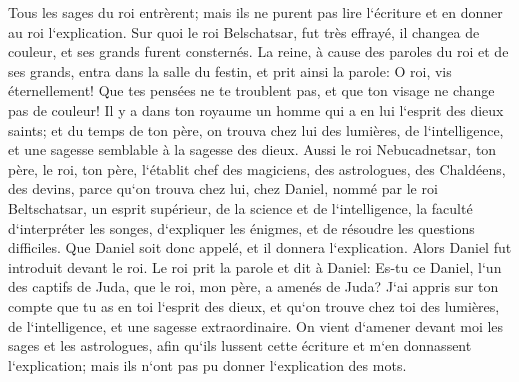 \verse Tous les sages du roi entrèrent; mais ils ne purent pas lire l`écriture et en donner au roi l`explication. 
\verse Sur quoi le roi Belschatsar, fut très effrayé, il changea de couleur, et ses grands furent consternés. 
\verse La reine, à cause des paroles du roi et de ses grands, entra dans la salle du festin, et prit ainsi la parole: O roi, vis éternellement! Que tes pensées ne te troublent pas, et que ton visage ne change pas de couleur! 
\verse Il y a dans ton royaume un homme qui a en lui l`esprit des dieux saints; et du temps de ton père, on trouva chez lui des lumières, de l`intelligence, et une sagesse semblable à la sagesse des dieux. Aussi le roi Nebucadnetsar, ton père, le roi, ton père, l`établit chef des magiciens, des astrologues, des Chaldéens, des devins, 
\verse parce qu`on trouva chez lui, chez Daniel, nommé par le roi Beltschatsar, un esprit supérieur, de la science et de l`intelligence, la faculté d`interpréter les songes, d`expliquer les énigmes, et de résoudre les questions difficiles. Que Daniel soit donc appelé, et il donnera l`explication. 
\verse Alors Daniel fut introduit devant le roi. Le roi prit la parole et dit à Daniel: Es-tu ce Daniel, l`un des captifs de Juda, que le roi, mon père, a amenés de Juda? 
\verse J`ai appris sur ton compte que tu as en toi l`esprit des dieux, et qu`on trouve chez toi des lumières, de l`intelligence, et une sagesse extraordinaire. 
\verse On vient d`amener devant moi les sages et les astrologues, afin qu`ils lussent cette écriture et m`en donnassent l`explication; mais ils n`ont pas pu donner l`explication des mots. 
